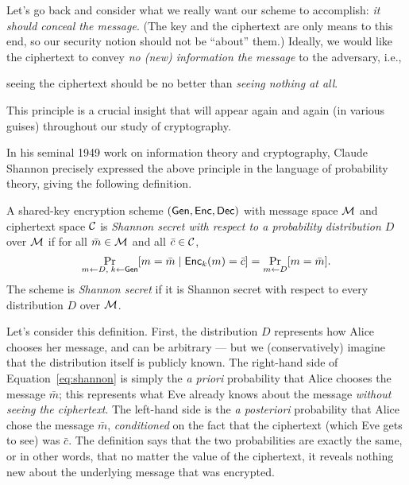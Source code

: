 \documentclass[11pt]{article}
\begin{document}
Let's go back and consider what we really want our scheme to
accomplish: \emph{it should conceal the message}.  (The key and the
ciphertext are only means to this end, so our security notion should
not be ``about'' them.)  Ideally, we would like the ciphertext to
convey \emph{no (new) information the message} to the adversary, i.e.,
\begin{center}
  seeing the ciphertext should be no better than \emph{seeing nothing
    at all}.
\end{center}
This principle is a crucial insight that will appear again and again
(in various guises) throughout our study of cryptography.

In his seminal 1949 work on information theory and cryptography,
Claude Shannon precisely expressed the above principle in the language
of probability theory, giving the following definition.

\begin{definition}
  \label{def:shannon-secrecy}
  A shared-key encryption scheme $(\mathsf{Gen},\mathsf{Enc},\mathsf{Dec})$ with
  message space $\mathcal{M}$ and ciphertext space $\mathcal{C}$ is
  \emph{Shannon secret with respect to a probability distribution $D$}
  over $\mathcal{M}$ if for all $\bar{m} \in \mathcal{M}$ and all $\bar{c}
  \in \mathcal{C}$,
  \begin{equation}
    \label{eq:shannon}
    \Pr_{m \gets D,\; k \gets \mathsf{Gen}}[m = \bar{m}\; |\;
    \mathsf{Enc}_{k}(m) = \bar{c} ] = \Pr_{m \gets D}[ m = \bar{m} ].
  \end{equation}
  The scheme is \emph{Shannon secret} if it is Shannon secret with
  respect to every distribution $D$ over $\mathcal{M}$.
\end{definition}

Let's consider this definition.  First, the distribution $D$
represents how Alice chooses her message, and can be arbitrary --- but
we (conservatively) imagine that the distribution itself is publicly
known.  The right-hand side of Equation~\eqref{eq:shannon} is simply
the \textit{a priori} probability that Alice chooses the message
$\bar{m}$; this represents what Eve already knows about the message
\emph{without seeing the ciphertext}.  The left-hand side is the
\textit{a posteriori} probability that Alice chose the message
$\bar{m}$, \emph{conditioned} on the fact that the ciphertext (which
Eve gets to see) was $\bar{c}$.  The definition says that the two
probabilities are exactly the same, or in other words, that no matter
the value of the ciphertext, it reveals nothing new about the
underlying message that was encrypted.
\end{document}
